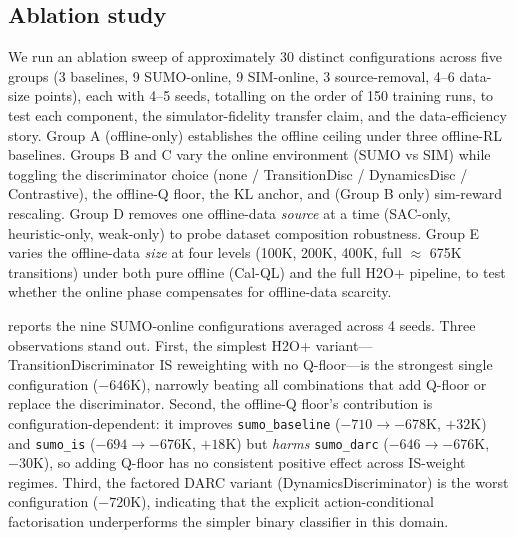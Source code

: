 \subsection{Ablation study}
\label{sec:exp:ablations}

We run an ablation sweep of approximately 30 distinct configurations across five groups (3 baselines, 9 SUMO-online, 9 SIM-online, 3 source-removal, 4--6 data-size points), each with 4--5 seeds, totalling on the order of 150 training runs, to test each component, the simulator-fidelity transfer claim, and the data-efficiency story.
Group A (offline-only) establishes the offline ceiling under three offline-RL baselines.
Groups B and C vary the online environment (SUMO vs SIM) while toggling the discriminator choice (none / TransitionDisc / DynamicsDisc / Contrastive), the offline-Q floor, the KL anchor, and (Group B only) sim-reward rescaling.
Group D removes one offline-data \emph{source} at a time (SAC-only, heuristic-only, weak-only) to probe dataset composition robustness.
Group E varies the offline-data \emph{size} at four levels (100K, 200K, 400K, full $\approx$ 675K transitions) under both pure offline (Cal-QL) and the full H2O+ pipeline, to test whether the online phase compensates for offline-data scarcity.

 reports the nine SUMO-online configurations averaged across 4 seeds.
Three observations stand out.
First, the simplest H2O+ variant---TransitionDiscriminator IS reweighting with no Q-floor---is the strongest single configuration ($-646$K), narrowly beating all combinations that add Q-floor or replace the discriminator.
Second, the offline-Q floor's contribution is configuration-dependent: it improves \texttt{sumo\_baseline} ($-710 \to -678$K, $+32$K) and \texttt{sumo\_is} ($-694 \to -676$K, $+18$K) but \emph{harms} \texttt{sumo\_darc} ($-646 \to -676$K, $-30$K), so adding Q-floor has no consistent positive effect across IS-weight regimes.
Third, the factored DARC variant (DynamicsDiscriminator) is the worst configuration ($-720$K), indicating that the explicit action-conditional factorisation underperforms the simpler binary classifier in this domain.

